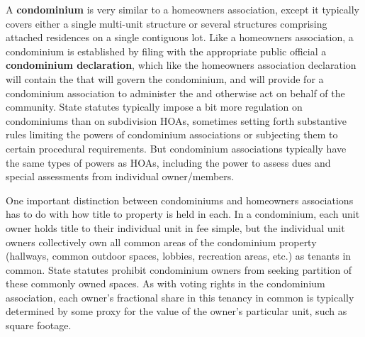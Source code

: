 A \textbf{condominium} is very similar to a homeowners association, except it
typically covers either a single multi-unit structure or several structures
comprising attached residences on a single contiguous lot. Like a homeowners
association, a condominium is established by filing with the appropriate public
official a \textbf{condominium declaration}, which like the homeowners
association declaration will contain the  that will govern the
condominium, and will provide for a condominium association to administer the
 and otherwise act on behalf of the community. State statutes
typically impose a bit more regulation on condominiums than on subdivision HOAs,
sometimes setting forth substantive rules limiting the powers of condominium
associations or subjecting them to certain procedural requirements. But
condominium associations typically have the same types of powers as HOAs,
including the power to assess dues and special assessments from individual
owner/members. 

One important distinction between condominiums and homeowners associations has
to do with how title to property is held in each. In a condominium, each unit
owner holds title to their individual unit in fee simple, but the individual
unit owners collectively own all common areas of the condominium property
(hallways, common outdoor spaces, lobbies, recreation areas, etc.) as tenants in
common. State statutes prohibit condominium owners from seeking partition of
these commonly owned spaces. As with voting rights in the condominium
association, each owner's fractional share in this tenancy in common is
typically determined by some proxy for the value of the owner's particular unit,
such as square footage.

